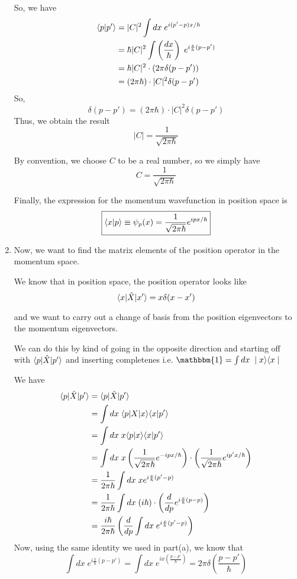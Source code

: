 \documentclass[twoside]{article}
\begin{document}
\begin{enumerate}
   So, we have 
   \begin{align*}
      \langle p | p' \rangle &= |C|^2 \int dx\; e^{i(p'-p)x/h} \\
                    &= \hbar|C|^2 \int \left(\frac{dx}{\hbar}\right)\;e^{i\frac{x}{h}(p-p')} \\
                    &= \hbar|C|^2 \cdot (2\pi\delta(p-p')) \\
                    &= (2\pi\hbar)\cdot|C|^2 \delta(p-p')
   \end{align*}
   So, 
   \[ \delta(p-p') = (2\pi\hbar)\cdot|C|^2 \delta(p-p') \]
   Thus, we obtain the result
   \[ |C| = \frac{1}{\sqrt{2\pi\hbar}} \]

   By convention, we choose $C$ to be a real number, so we simply have 
   \[ C = \frac{1}{\sqrt{2\pi\hbar}} \]

   Finally, the expression for the momentum wavefunction in position space is 
   \[ \boxed{\langle x | p \rangle \equiv \psi_p(x) = \frac{1}{\sqrt{2\pi\hbar}} e^{ipx/\hbar}} \]

   \item Now, we want to find the matrix elements of the position operator in the momentum space. 
   
   We know that in position space, the position operator looks like
   \[ \langle x | \hat{X}|x' \rangle = x\delta(x-x')  \]

   and we want to carry out a change of basis from the position eigenvectors to the momentum eigenvectors.

   We can do this by kind of going in the opposite direction and starting off with $\langle p | \hat{X}|p' \rangle$ and inserting completenes i.e. $\mathbbm{1} = \int dx\; \ket{x}\bra{x}$

   We have 
   \begin{align*}
      \langle p | \hat{X}|p' \rangle &= \langle p | \hat{X}|p' \rangle \\
                            &= \int dx\; \langle p | X|x \rangle\langle x | p' \rangle \\
                            &= \int dx\;x\langle p | x \rangle\langle x | p' \rangle \\
                            &= \int dx\; x \left( \frac{1}{\sqrt{2\pi\hbar}}e^{-ipx/\hbar} \right) \cdot \left( \frac{1}{\sqrt{2\pi\hbar}}e^{ip'x/\hbar} \right) \\
                            &= \frac{1}{2\pi\hbar} \int dx\; x e^{i\frac{x}{\hbar}(p'-p)} \\
                            &= \frac{1}{2\pi\hbar} \int dx\;(i\hbar) \cdot \left( \frac{d}{dp} e^{i\frac{x}{\hbar}(p-p)} \right) \\
                            &= \frac{i\hbar}{2\pi\hbar} \left( \frac{d}{dp} \int dx\; e^{i\frac{x}{h}(p'-p)} \right) \\
   \end{align*}
   Now, using the same identity we used in part(a), we know that 
   \[ \int dx\; e^{i\frac{x}{\hbar}(p-p')} =  \int dx\; e^{ix(\frac{p-p'}{\hbar})} = 2\pi\delta\left(\frac{p-p'}{\hbar}\right) \]


\end{enumerate}
\end{document}
